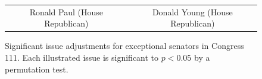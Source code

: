 \begin{figure}
\begin{tabular}{cc}
    Ronald Paul (House Republican) & Donald Young (House Republican) \\
  \end{tabular}
    \caption{Significant issue adjustments for exceptional senators in
  Congress 111.  Each illustrated issue is significant to $p <
  0.05$ by a permutation test.}
  \label{fig:significant_offsets}
\end{figure}





